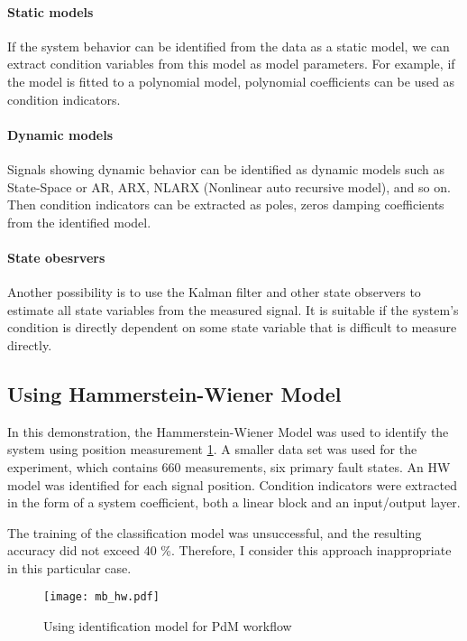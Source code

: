 \paragraph{Static models}
If the system behavior can be identified from the data as a static model,
we can extract condition variables from this model as model parameters. For
example, if the model is fitted to a polynomial model, polynomial
coefficients can be used as condition indicators.

\paragraph{Dynamic models}
Signals showing dynamic behavior can be identified as dynamic models such
as State-Space or AR, ARX, NLARX (Nonlinear auto recursive model), and so
on.  Then condition indicators can be extracted as poles, zeros damping
coefficients from the identified model.

\paragraph{State obesrvers}
Another possibility is to use the Kalman filter and other state observers
to estimate all state variables from the measured signal. It is suitable if
the system's condition is directly dependent on some state variable that is
difficult to measure directly.

\subsection{Using Hammerstein-Wiener Model}\label{sec:mb_hw_demo}
In this demonstration, the Hammerstein-Wiener Model was used to identify
the system using position measurement \ref{fig:mb_hw_workflow}. A smaller
data set was used for the experiment, which contains 660 measurements, six
primary fault states. An HW model was identified for each signal position.
Condition indicators were extracted in the form of a system coefficient,
both a linear block and an input/output layer.

The training of the classification model was unsuccessful, and the
resulting accuracy did not exceed 40 \%. Therefore, I consider this
approach inappropriate in this particular case.

\begin{figure}[h!]
    \centering
    \texttt{[image: mb\_hw.pdf]}
    \caption{Using identification model for PdM workflow}
    \label{fig:mb_hw_workflow}
\end{figure}


